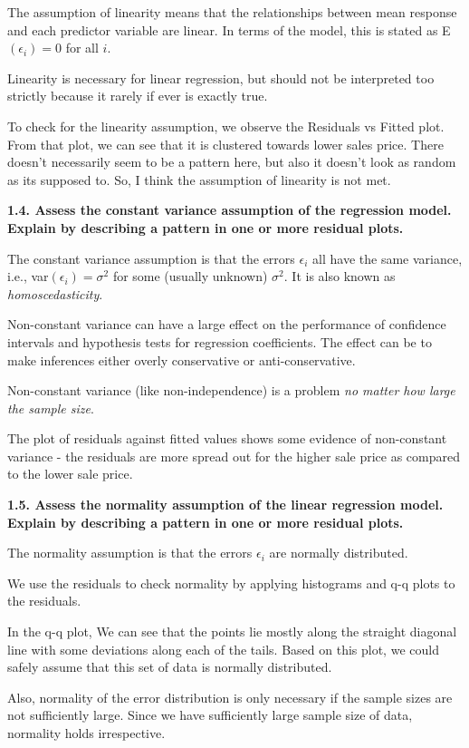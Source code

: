 \documentclass[
]{article}
\begin{document}
The assumption of linearity means that the relationships between mean
response and each predictor variable are linear. In terms of the model,
this is stated as E\((\epsilon_i)=0\) for all \(i\).

Linearity is necessary for linear regression, but should not be
interpreted too strictly because it rarely if ever is exactly true.

To check for the linearity assumption, we observe the Residuals vs
Fitted plot. From that plot, we can see that it is clustered towards
lower sales price. There doesn't necessarily seem to be a pattern here,
but also it doesn't look as random as its supposed to. So, I think the
assumption of linearity is not met.

\textbf{1.4. Assess the constant variance assumption of the regression
model. Explain by describing a pattern in one or more residual plots.}

The constant variance assumption is that the errors \(\epsilon_i\) all
have the same variance, i.e., var\((\epsilon_i)=\sigma^2\) for some
(usually unknown) \(\sigma^2\). It is also known as
\emph{homoscedasticity}.

Non-constant variance can have a large effect on the performance of
confidence intervals and hypothesis tests for regression coefficients.
The effect can be to make inferences either overly conservative or
anti-conservative.

Non-constant variance (like non-independence) is a problem \emph{no
matter how large the sample size}.

The plot of residuals against fitted values shows some evidence of
non-constant variance - the residuals are more spread out for the higher
sale price as compared to the lower sale price.

\textbf{1.5. Assess the normality assumption of the linear regression
model. Explain by describing a pattern in one or more residual plots.}

The normality assumption is that the errors \(\epsilon_i\) are normally
distributed.

We use the residuals to check normality by applying histograms and q-q
plots to the residuals.

In the q-q plot, We can see that the points lie mostly along the
straight diagonal line with some deviations along each of the tails.
Based on this plot, we could safely assume that this set of data is
normally distributed.

Also, normality of the error distribution is only necessary if the
sample sizes are not sufficiently large. Since we have sufficiently
large sample size of data, normality holds irrespective.
\end{document}
